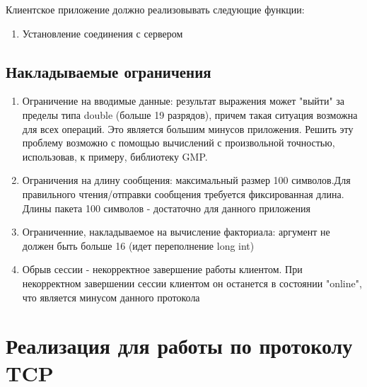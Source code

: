 \documentclass[12pt,a4paper]{report}
\begin{document}
Клиентское приложение должно реализовывать следующие функции:
\begin{enumerate}
\item{Установление соединения с сервером}
\end{enumerate}

\section{Накладываемые ограничения}
\begin{enumerate}
\item{Ограничение на вводимые данные: результат выражения может "выйти" за пределы типа double (больше 19 разрядов), причем такая ситуация возможна для всех операций. Это является большим минусов приложения. Решить эту проблему возможно с помощью вычислений с произвольной точностью, использовав, к примеру, библиотеку GMP.}
\item{Ограничения на длину сообщения: максимальный размер 100 символов.Для правильного чтения/отправки сообщения требуется фиксированная длина. Длины пакета 100 символов - достаточно для данного приложения}
\item{Ограниченние, накладываемое на вычисление факториала: аргумент не должен быть больше 16 (идет переполнение long int)}
\item {Обрыв сессии - некорректное завершение работы клиентом. При некорректном завершении сессии клиентом он останется в состоянии "online", что является минусом данного протокола}
\end{enumerate}
\chapter{Реализация для работы по протоколу TCP}
\end{document}
